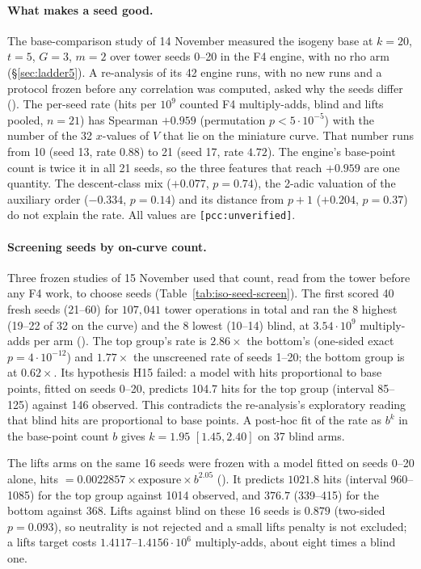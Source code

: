 \paragraph{What makes a seed good.} The base-comparison study of
14 November measured the isogeny base at $k=20$, $t=5$, $G=3$, $m=2$ over
tower seeds 0--20 in the F4 engine, with no rho arm (\S\ref{sec:ladder5}).
A re-analysis of its 42 engine runs, with no new runs and a protocol frozen
before any correlation was computed, asked why the seeds differ
(). The
per-seed rate (hits per $10^9$ counted F4 multiply-adds, blind and lifts
pooled, $n=21$) has Spearman $+0.959$ (permutation $p<5\cdot10^{-5}$) with
the number of the 32 $x$-values of $V$ that lie on the miniature curve.
That number runs from 10 (seed 13, rate $0.88$) to 21 (seed 17, rate
$4.72$). The engine's base-point count is twice it in all 21 seeds, so the
three features that reach $+0.959$ are one quantity. The descent-class mix
($+0.077$, $p=0.74$), the 2-adic valuation of the auxiliary order
($-0.334$, $p=0.14$) and its distance from $p+1$ ($+0.204$, $p=0.37$) do
not explain the rate. All values are \texttt{[pcc:unverified]}.

\paragraph{Screening seeds by on-curve count.} Three frozen studies of
15 November used that count, read from the tower before any F4 work, to
choose seeds (Table~\ref{tab:iso-seed-screen}). The first scored 40 fresh
seeds (21--60) for $107{,}041$ tower operations in total and ran the 8
highest (19--22 of 32 on the curve) and the 8 lowest (10--14) blind, at
$3.54\cdot10^9$ multiply-adds per arm
(). The top
group's rate is $2.86\times$ the bottom's (one-sided exact $p=4\cdot10^{-12}$)
and $1.77\times$ the unscreened rate of seeds 1--20; the bottom group is at
$0.62\times$. Its hypothesis H15 failed: a model with hits proportional to
base points, fitted on seeds 0--20, predicts 104.7 hits for the top group
(interval 85--125) against 146 observed. This contradicts the re-analysis's
exploratory reading that blind hits are proportional to base points. A
post-hoc fit of the rate as $b^k$ in the base-point count $b$ gives
$k=1.95$ $[1.45,2.40]$ on 37 blind arms.

The lifts arms on the same 16 seeds were frozen with a model fitted on
seeds 0--20 alone, hits $=0.0022857\times\text{exposure}\times b^{2.05}$
().
It predicts $1021.8$ hits (interval 960--1085) for the top group against
1014 observed, and $376.7$ (339--415) for the bottom against 368. Lifts
against blind on these 16 seeds is $0.879$ (two-sided $p=0.093$), so
neutrality is not rejected and a small lifts penalty is not excluded; a
lifts target costs $1.4117$--$1.4156\cdot10^6$ multiply-adds, about eight
times a blind one.

